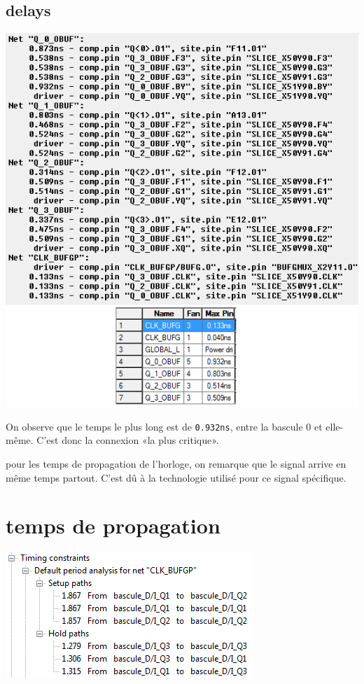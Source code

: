 \documentclass{article}
\begin{document}
\subsection{delays}
\includegraphics{delay}

On observe que le temps le plus long est de \verb|0.932ns|, entre la bascule 0 et elle-même.
C’est donc la connexion «la plus critique».

pour les temps de propagation de l’horloge, on remarque que le signal arrive en même temps partout.
C’est dû à la technologie utilisé pour ce signal spécifique.

\section{temps de propagation}
\includegraphics{temps_de_propagation}
\end{document}
